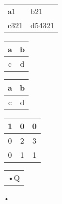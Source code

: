 \documentclass{article}
\begin{document}
	\begin{center}
	\end{center}


	\begin{tabular}{ll|}
		\hline
		\vline a1 &  \vline b21 \\
		c321 & d54321 \\
	\end{tabular}
	\begin{tabular}{|c|c|}
		\hline
		a & b \\
		\hline
		c & d \\
		\hline
	\end{tabular}	
	\begin{center}
		\begin{tabular}{|c|c|}
			\hline
			a & b \\ \hline
			c & d \\
			\hline
		\end{tabular}
	\end{center}

    \begin{tabular}{|c|c|c|}
      \hline
      1 & 0 & 0 \\ \hline
      0 & 2 & 3 \\ \hline
      0 & 1 & 1 \\
      \hline
    \end{tabular}
	
	\begin{tabular}{|r|}
	•Q
	\end{tabular}•
\end{document}
